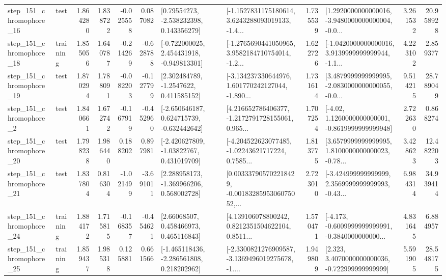 \begin{tabular}{llrrrrllrlrr}
  step\_151\_chromophore\_16 &      test &      1.864280 &    1.838722 &     -0.025558 &  0.087082 &     [0.79554273, -2.538232398, 0.143356279] &  [-1.1527831175180614, 3.6243288093019133, -1.4... &       1.735539 &  [1.2920000000000016, -3.9480000000000004, -0.0... &            3.261532 &         20.958928 \\
  step\_151\_chromophore\_18 &  training &      1.855056 &    1.640787 &     -0.214269 & -0.628788 &   [-0.722000025, 2.454431918, -0.949813301] &  [-1.2765690441050965, 3.9582184710754014, -1.2... &       1.622726 &  [-1.0420000000000016, 3.9139999999999944, -1.1... &            4.223102 &          2.859377 \\
  step\_151\_chromophore\_19 &      test &      1.870294 &    1.788091 &     -0.082203 & -0.127799 &      [2.302484789, -1.2547622, 0.411585152] &  [-3.134237330644976, 1.601770242127044, -1.890... &       1.731614 &  [3.4879999999999995, -2.0830000000000055, -0.0... &            9.514215 &         28.789049 \\
   step\_151\_chromophore\_2 &      test &      1.840661 &    1.672742 &     -0.167919 & -0.452960 &   [-2.650646187, 0.624715739, -0.632442642] &  [4.216652786406377, -1.2172791728155061, 0.965... &       1.707254 &   [-4.02, 1.1260000000000001, -0.8619999999999948] &            2.722630 &          0.868274 \\
  step\_151\_chromophore\_20 &      test &      1.798238 &    1.986440 &      0.188202 &  0.897981 &    [-2.420627809, -1.03822767, 0.431019709] &  [-4.204522623077485, -1.02243621717224, 0.7585... &       1.813775 &  [3.6579999999999995, 1.8100000000000023, -0.78... &            3.428623 &         12.482203 \\
  step\_151\_chromophore\_21 &      test &      1.837804 &    0.816304 &     -1.021499 & -3.691011 &    [2.288958173, -1.369966206, 0.568002728] &  [0.003337905702218429, -0.0018328595306075052,... &       2.723010 &  [-3.424999999999999, 2.3569999999999993, -0.43... &            6.984314 &         34.939414 \\
  step\_151\_chromophore\_24 &  training &      1.884172 &    1.715815 &     -0.168357 & -0.454621 &      [2.66068507, 0.458466973, 0.465116843] &  [4.139106078800242, 0.8212351504622104, 0.8511... &       1.570471 &  [-4.173, -0.6009999999999991, -0.3840000000000... &            4.831645 &          6.884957 \\
  step\_151\_chromophore\_25 &  training &      1.859437 &    1.985318 &      0.125881 &  0.661566 &   [-1.465118436, -2.286561808, 0.218202962] &  [-2.3300821276909587, -3.1369496019275678, -1.... &       1.949809 &    [2.323, 3.4070000000000036, -0.722999999999999] &            5.591905 &         28.548175 \\

\end{tabular}
